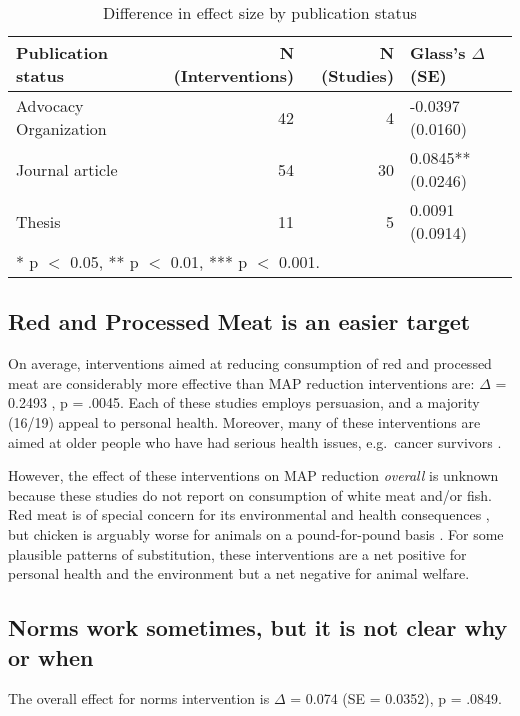 \documentclass[sn-nature,pdflatex]{sn-jnl}
\begin{document}
\begin{table}[!h]
\centering
\caption{\label{tab:tab:table_two}Difference in effect size by publication status}
\centering
\begin{tabular}[t]{lrrl}
\toprule
Publication status & N (Interventions) & N (Studies) & Glass's $\Delta$ (SE)\\
\midrule
Advocacy Organization & 42 & 4 & -0.0397 (0.0160)\\
Journal article & 54 & 30 & 0.0845** (0.0246)\\
Thesis & 11 & 5 & 0.0091 (0.0914)\\
\bottomrule
\multicolumn{4}{l}{\rule{0pt}{1em}* p $<$ 0.05, ** p $<$ 0.01, *** p $<$ 0.001.}\\
\end{tabular}
\end{table}

\subsection{Red and Processed Meat is an easier
target}\label{red-and-processed-meat-is-an-easier-target}

On average, interventions aimed at reducing consumption of red and
processed meat are considerably more effective than MAP reduction
interventions are: \(\Delta\) = 0.2493 , p = .0045.
Each of these studies employs persuasion, and a majority (16/19) appeal
to personal health. Moreover, many of these interventions are aimed at
older people who have had serious health issues, e.g.~cancer survivors
\citep{lee2018, james2015}.

However, the effect of these interventions on MAP reduction
\emph{overall} is unknown because these studies do not report on
consumption of white meat and/or fish. Red meat is of special concern
for its environmental and health consequences \citep{grummon2023}, but
chicken is arguably worse for animals on a pound-for-pound basis
\citep{mathur2022}. For some plausible patterns of substitution, these
interventions are a net positive for personal health and the environment
but a net negative for animal welfare.

\subsection{Norms work sometimes, but it is not clear why or
when}\label{norms-work-sometimes-but-it-is-not-clear-why-or-when}

The overall effect for norms intervention is \(\Delta\) = 0.074 (SE =
0.0352), p = .0849.
\end{document}
